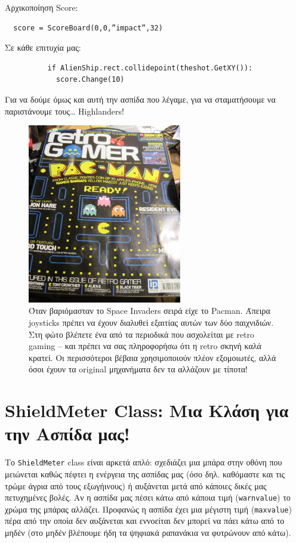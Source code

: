 Αρχικοποίηση Score:

\begin{verbatim}
  score = ScoreBoard(0,0,”impact”,32)
\end{verbatim}

Σε κάθε επιτυχία μας:

\begin{verbatim}
          if AlienShip.rect.collidepoint(theshot.GetXY()):
            score.Change(10)
\end{verbatim}

Για να δούμε όμως και αυτή την ασπίδα που λέγαμε, για να σταματήσουμε να παριστάνουμε τους\ldots{} Highlanders!

\begin{figure}
\centering
\includegraphics[width=0.60\textwidth]{images/chapter9/retro-pacman.jpg}
\caption[Pacman]{Όταν βαριόμασταν το Space Invaders σειρά είχε το Pacman. Άπειρα joysticks πρέπει να έχουν διαλυθεί εξαιτίας αυτών των δύο παιχνιδιών. Στη φώτο βλέπετε ένα από τα περιοδικά που ασχολείται με retro gaming -- και πρέπει να σας πληροφορήσω ότι η retro σκηνή καλά κρατεί. Οι περισσότεροι βέβαια χρησιμοποιούν πλέον εξομοιωτές, αλλά όσοι έχουν τα original μηχανήματα δεν τα αλλάζουν με τίποτα!}
\label{9-5}
\end{figure}
%
\section{ShieldMeter Class: Μια Κλάση για την Ασπίδα μας!}
%
Το {\tt ShieldMeter} class είναι αρκετά απλό: σχεδιάζει μια μπάρα στην οθόνη που μειώνεται καθώς πέφτει η ενέργεια της ασπίδας μας (όσο δηλ. καθόμαστε και τις τρώμε άγρια από τους εξωγήινους) ή αυξάνεται μετά από κάποιες δικές μας πετυχημένες βολές. Αν η ασπίδα μας πέσει κάτω από κάποια τιμή ({\tt warnvalue}) το χρώμα της μπάρας αλλάζει. Προφανώς η ασπίδα έχει μια μέγιστη τιμή ({\tt maxvalue}) πέρα από την οποία δεν αυξάνεται και εννοείται δεν μπορεί να πάει κάτω από το μηδέν (στο μηδέν βλέπουμε ήδη τα ψηφιακά ραπανάκια να φυτρώνουν από κάτω). 

